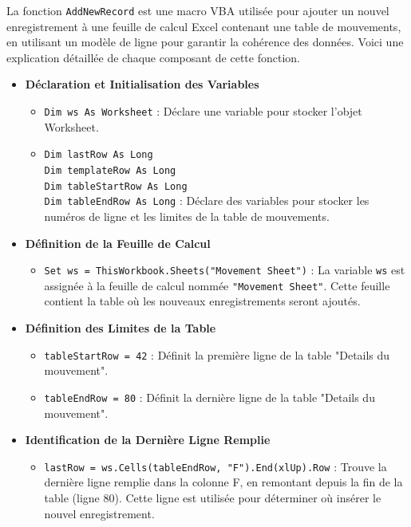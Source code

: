 \documentclass[a4paper, oneside, 12pt, final]{extreport}
\begin{document}
La fonction \texttt{AddNewRecord} est une macro VBA utilisée pour ajouter un nouvel enregistrement à une feuille de calcul Excel contenant une table de mouvements, en utilisant un modèle de ligne pour garantir la cohérence des données. Voici une explication détaillée de chaque composant de cette fonction.
\begin{itemize}

\item\textbf{Déclaration et Initialisation des Variables}

\begin{itemize}
    \item \texttt{Dim ws As Worksheet} : Déclare une variable pour stocker l'objet Worksheet.
    \item \texttt{Dim lastRow As Long} \\ 
          \texttt{Dim templateRow As Long} \\ 
          \texttt{Dim tableStartRow As Long} \\ 
          \texttt{Dim tableEndRow As Long} : Déclare des variables pour stocker les numéros de ligne et les limites de la table de mouvements.
\end{itemize}

\item\textbf{Définition de la Feuille de Calcul}

\begin{itemize}
    \item \texttt{Set ws = ThisWorkbook.Sheets("Movement Sheet")} : La variable \texttt{ws} est assignée à la feuille de calcul nommée \texttt{"Movement Sheet"}. Cette feuille contient la table où les nouveaux enregistrements seront ajoutés.
\end{itemize}

\item\textbf{Définition des Limites de la Table}

\begin{itemize}
    \item \texttt{tableStartRow = 42} : Définit la première ligne de la table "Details du mouvement".
    \item \texttt{tableEndRow = 80} : Définit la dernière ligne de la table "Details du mouvement".
\end{itemize}

\item\textbf{Identification de la Dernière Ligne Remplie}

\begin{itemize}
    \item \texttt{lastRow = ws.Cells(tableEndRow, "F").End(xlUp).Row} : Trouve la dernière ligne remplie dans la colonne F, en remontant depuis la fin de la table (ligne 80). Cette ligne est utilisée pour déterminer où insérer le nouvel enregistrement.
\end{itemize}


\end{itemize}
\end{document}
